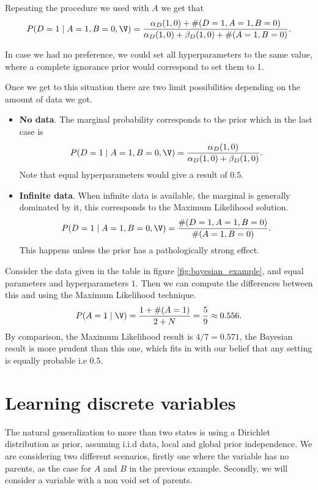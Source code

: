 Repeating the procedure we used with \(A\) we get that
\[
  P(D = 1 \mid A = 1, B = 0, \V) = \frac{\alpha_{D}(1,0) + \#(D = 1, A = 1, B = 0)}{\alpha_{D}(1,0) + \beta_{D}(1,0) + \#(A=1, B = 0)}.
\]

In case we had no preference, we could set all hyperparameters to the same
value, where a complete ignorance prior would correspond to set them to 1.

Once we get to this situation there are two limit possibilities depending on the amount of data we got.
\begin{itemize}
  \item \textbf{No data}. The marginal probability corresponds to the prior which
in the last case is
    \[
    P(D = 1 \mid A = 1, B = 0, \V) = \frac{\alpha_{D}(1,0)}{\alpha_{D}(1,0) + \beta_{D}(1,0)}.
    \]
    Note that equal hyperparameters would give a result of \(0.5\).\newline
   
  \item \textbf{Infinite data}. When infinite data is available, the marginal is generally dominated by it,
    this corresponds to the Maximum Likelihood solution.
    \[
    P(D = 1 \mid A = 1, B = 0, \V) = \frac{\#(D = 1, A = 1 , B = 0)}{\#(A = 1, B = 0)}.
    \]
    This happens unless the prior has a pathologically strong effect.
\end{itemize}

 Consider the data given in the table in figure \ref{fig:bayesian_example}, and
 equal parameters and hyperparameters \(1\). Then we can compute the differences
 between this and using the Maximum Likelihood technique.
 \[
   P(A = 1 \mid \V) = \frac{1 + \#(A = 1)}{2 + N} = \frac{5}{9} \approx 0.556.
 \]
 By comparison, the Maximum Likelihood result is \(4/7 = 0.571\), the Bayesian
 result is more prudent than this one, which fits in with our belief that any
 setting is equally probable i.e \(0.5\).

 \section{Learning discrete variables}

 The natural generalization to more than two states is using a Dirichlet
 distribution as prior, assuming i.i.d data, local and global prior
 independence. We are considering two different scenarios, firstly one where the
 variable has no parents, as the case for \(A\) and \(B\) in the previous
 example. Secondly, we will consider a variable with a non void set of parents.

